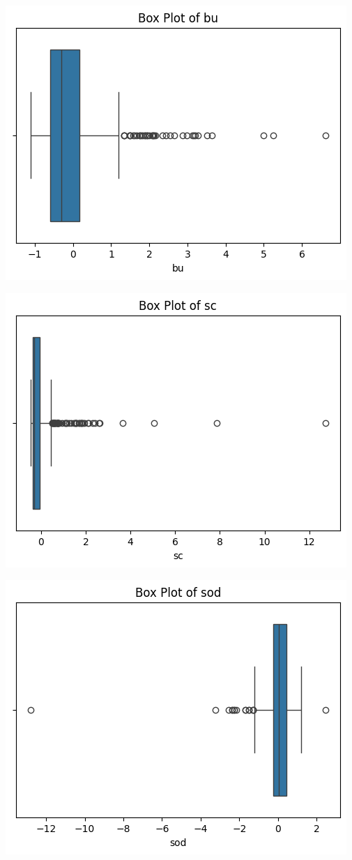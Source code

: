 \documentclass[
  11pt,
  letterpaper,
  DIV=11,
  numbers=noendperiod]{scrartcl}
\begin{document}
\includegraphics{Assignment6_Final version_files/figure-pdf/cell-18-output-5.png}

\includegraphics{Assignment6_Final version_files/figure-pdf/cell-18-output-6.png}

\includegraphics{Assignment6_Final version_files/figure-pdf/cell-18-output-7.png}
\end{document}
